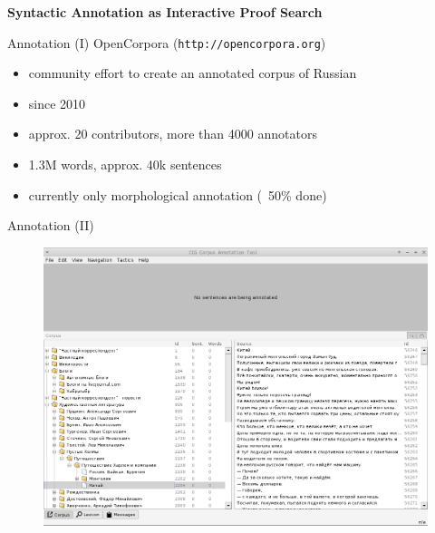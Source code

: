 \documentclass{beamer}
\begin{document}
\begin{frame}{}
\begin{center}
	\textbf{Syntactic Annotation as Interactive Proof Search}
\end{center}
\end{frame}

\begin{frame}{Annotation (I)}
OpenCorpora (\texttt{http://opencorpora.org})\\
\bigskip
\begin{itemize}
    \item community effort to create an annotated corpus of Russian
    \item since 2010
    \item approx. 20 contributors, more than 4000 annotators
    \item 1.3M words, approx. 40k sentences
    \item currently only morphological annotation (~50\% done)
\end{itemize}
\end{frame}

\begin{frame}{Annotation (II)}
\begin{center}
	\begin{figure}[H]
		\includegraphics[scale=0.285]{annotation1.png} 
	\end{figure}
\end{center}
\end{frame}
\end{document}
